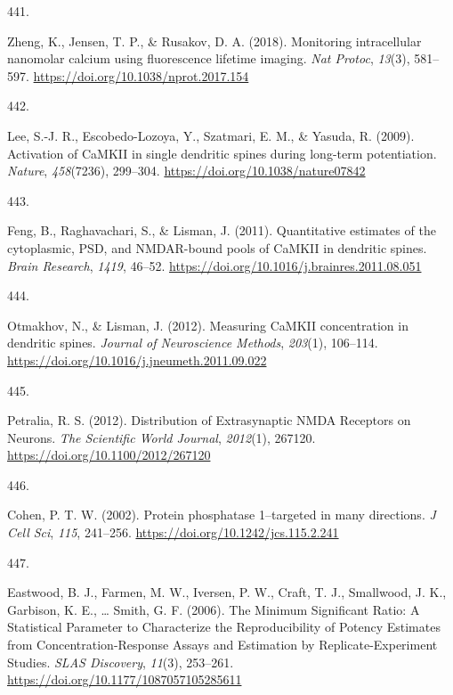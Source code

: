 \documentclass[
  11pt,
  letterpaper,
]{scrreprt}
\newlength{\cslhangindent}
\newlength{\csllabelwidth}
\newenvironment{CSLReferences}[2] %
 {\begin{list}{}{%
  \setlength{\itemindent}{0pt}
  \setlength{\leftmargin}{0pt}
  \setlength{\parsep}{0pt}
  \ifodd #1
   \setlength{\leftmargin}{\cslhangindent}
   \setlength{\itemindent}{-1\cslhangindent}
  \fi
  \setlength{\itemsep}{#2\baselineskip}}}
 {\end{list}}
\newcommand{\CSLLeftMargin}[1]{\parbox[t]{\csllabelwidth}{\strut#1\strut}}
\newcommand{\CSLRightInline}[1]{\parbox[t]{\linewidth - \csllabelwidth}{\strut#1\strut}}
\begin{document}
\begin{CSLReferences}{0}{0}
\CSLLeftMargin{441. }%
\CSLRightInline{Zheng, K., Jensen, T. P., \& Rusakov, D. A. (2018).
Monitoring intracellular nanomolar calcium using fluorescence lifetime
imaging. \emph{Nat Protoc}, \emph{13}(3), 581--597.
\url{https://doi.org/10.1038/nprot.2017.154}}

\CSLLeftMargin{442. }%
\CSLRightInline{Lee, S.-J. R., Escobedo-Lozoya, Y., Szatmari, E. M., \&
Yasuda, R. (2009). Activation of {CaMKII} in single dendritic spines
during long-term potentiation. \emph{Nature}, \emph{458}(7236),
299--304. \url{https://doi.org/10.1038/nature07842}}

\CSLLeftMargin{443. }%
\CSLRightInline{Feng, B., Raghavachari, S., \& Lisman, J. (2011).
Quantitative estimates of the cytoplasmic, {PSD}, and {NMDAR-bound}
pools of {CaMKII} in dendritic spines. \emph{Brain Research},
\emph{1419}, 46--52.
\url{https://doi.org/10.1016/j.brainres.2011.08.051}}

\CSLLeftMargin{444. }%
\CSLRightInline{Otmakhov, N., \& Lisman, J. (2012). Measuring {CaMKII}
concentration in dendritic spines. \emph{Journal of Neuroscience
Methods}, \emph{203}(1), 106--114.
\url{https://doi.org/10.1016/j.jneumeth.2011.09.022}}

\CSLLeftMargin{445. }%
\CSLRightInline{Petralia, R. S. (2012). Distribution of {Extrasynaptic
NMDA Receptors} on {Neurons}. \emph{The Scientific World Journal},
\emph{2012}(1), 267120. \url{https://doi.org/10.1100/2012/267120}}

\CSLLeftMargin{446. }%
\CSLRightInline{Cohen, P. T. W. (2002). Protein phosphatase 1--targeted
in many directions. \emph{J Cell Sci}, \emph{115}, 241--256.
\url{https://doi.org/10.1242/jcs.115.2.241}}

\CSLLeftMargin{447. }%
\CSLRightInline{Eastwood, B. J., Farmen, M. W., Iversen, P. W., Craft,
T. J., Smallwood, J. K., Garbison, K. E., \ldots{} Smith, G. F. (2006).
The {Minimum Significant Ratio}: {A Statistical Parameter} to
{Characterize} the {Reproducibility} of {Potency Estimates} from
{Concentration-Response Assays} and {Estimation} by
{Replicate-Experiment Studies}. \emph{SLAS Discovery}, \emph{11}(3),
253--261. \url{https://doi.org/10.1177/1087057105285611}}


\end{CSLReferences}
\end{document}
